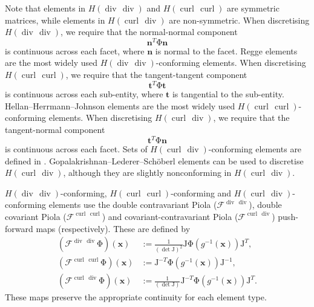 \documentclass[sn-mathphys-num]{sn-jnl}%
\theoremstyle{thmstyleone}%
\newcommand{\mat}[1]{\boldsymbol{\mathrm{#1}}}
\renewcommand{\vec}[1]{\boldsymbol{#1}}
\newcommand{\scurl}{\operatorname{curl}}
\newcommand{\sdiv}{\operatorname{div}}
\newcommand{\vcurl}{\scurl}
\newcommand{\mapping}{\mathcal{F}}
\newcommand{\geometrymap}{g}
\newcommand{\jacobian}{\mat{J}}
\newcommand{\transpose}{^T}
\newcommand{\invtranspose}{^{-T}}
\newcommand{\inv}{^{-1}}
\theoremstyle{thmstyletwo}%
\theoremstyle{thmstylethree}%
\begin{document}
Note that elements in $H(\sdiv\,\sdiv)$ and $H(\vcurl\,\vcurl)$ are symmetric matrices, while elements
in $H(\vcurl\,\sdiv)$ are non-symmetric.
When discretising $H(\sdiv\,\sdiv)$,
we require that
the normal-normal component
$$\vec{n}\transpose\mat{\Phi}\vec{n}$$
is continuous across each facet,
where $\vec{n}$ is normal to the facet.
Regge elements \cite{regge-0,regge-1}
are the most widely used
$H(\sdiv\,\sdiv)$-conforming elements.
When discretising $H(\vcurl\,\vcurl)$,
we require that
the tangent-tangent component
$$\vec{t}\transpose\mat{\Phi}\vec{t}$$
is continuous across each sub-entity,
where $\vec{t}$ is tangential to the sub-entity.
Hellan--Herrmann--Johnson elements \cite{hhj}
are the most widely used
$H(\vcurl\,\vcurl)$-conforming elements.
When discretising $H(\vcurl\,\sdiv)$,
we require that
the tangent-normal component
$$\vec{t}\transpose\mat{\Phi}\vec{n}$$
is continuous across each facet.
Sets of $H(\vcurl\,\sdiv)$-conforming elements are defined in \cite{hu-lin,hu-lin-zhang}.
Gopalakrishnan--Lederer--Sch\"oberl elements \cite{gopalakrishnan-lederer-schoberl}\cite[section 5.3]{lederer-schoberl}
can be used to discretise
$H(\vcurl\,\sdiv)$, although they are slightly nonconforming in $H(\vcurl\,\sdiv)$.

$H(\sdiv\,\sdiv)$-conforming,
$H(\vcurl\,\vcurl)$-conforming and
$H(\vcurl\,\sdiv)$-conforming elements use the
double contravariant Piola ($\mapping^{\sdiv\,\sdiv}$),
double covariant Piola ($\mapping^{\vcurl\,\vcurl}$)
and
covariant-contravariant Piola ($\mapping^{\vcurl\,\sdiv}$)
push-forward maps (respectively). These are defined by
\begin{align*}
\left(\mapping^{\sdiv\,\sdiv}\mat{\Phi}\right)(\boldsymbol{x})&:=\frac1{\left(\det\jacobian\right)^2}\jacobian\mat{\Phi}(\geometrymap\inv(\boldsymbol{x}))\jacobian\transpose,\\
\left(\mapping^{\vcurl\,\vcurl}\mat{\Phi}\right)(\boldsymbol{x})&:=\jacobian\invtranspose\mat{\Phi}(\geometrymap\inv(\boldsymbol{x}))\jacobian\inv,\\
\left(\mapping^{\vcurl\,\sdiv}\mat{\Phi}\right)(\boldsymbol{x})&:=\frac1{\left(\det\jacobian\right)}\jacobian\invtranspose\mat{\Phi}(\geometrymap\inv(\boldsymbol{x}))\jacobian\transpose.
\end{align*}
These maps preserve the appropriate continuity for each element type.

\end{document}
